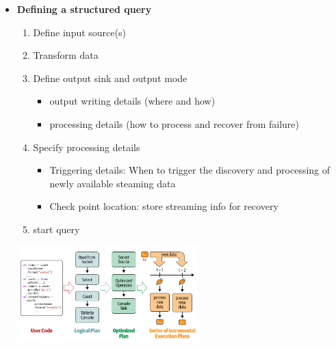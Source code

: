 \documentclass[10pt, landscape]{article}
\begin{document}
\begin{multicols}{4}
\begin{itemize}
  \item \textbf{Defining a structured query}
  \begin{enumerate}
    \item Define input source(s)
    \item Transform data 
    \item Define output sink and output mode 
    \begin{itemize}
      \item output writing details (where and how)
      \item processing details (how to process and recover from failure)
    \end{itemize}
    \item Specify processing details 
    \begin{itemize}
      \item Triggering details: When to trigger the discovery and processing of newly available steaming data 
      \item Check point location: store streaming info for recovery 
    \end{itemize}
    \item start query
  \end{enumerate}
  \includegraphics*[width=7cm]{incremental_exe2.png}
\end{itemize}


\end{multicols}
\end{document}
